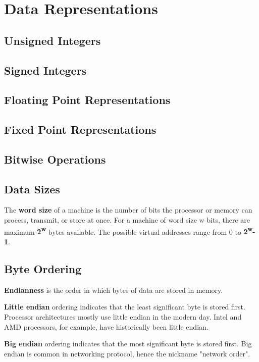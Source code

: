 \chapter{Data Representations}

\section{Unsigned Integers}

\section{Signed Integers}

\section{Floating Point Representations}

\section{Fixed Point Representations}

\section{Bitwise Operations}

\section{Data Sizes}
The \textbf{word size} of a machine is the number of bits the processor or memory can process, transmit, or store at once. For a machine of word size w bits, there are maximum \textbf{2\textsuperscript{w}} bytes available. The possible virtual addresses range from 0 to \textbf{2\textsuperscript{w}-1}.

\section{Byte Ordering}

\textbf{Endianness} is the order in which bytes of data are stored in memory.

\textbf{Little endian} ordering indicates that the least significant byte is stored first. Processor architectures mostly use little endian in the modern day. Intel and AMD processors, for example, have historically been little endian.

\textbf{Big endian} ordering indicates that the most significant byte is stored first. Big endian is common in networking protocol, hence the nickname "network order".

